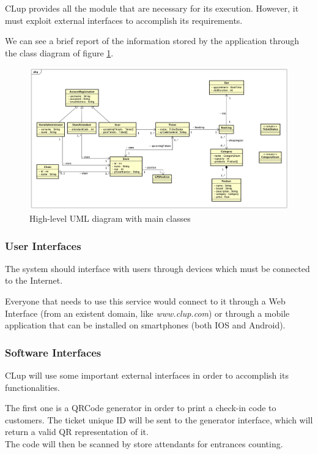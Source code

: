 \documentclass[table, 12pt]{article}
\begin{document}
CLup provides all the module that are necessary for its execution. However, it must exploit external interfaces to accomplish its requirements.

We can see a brief report of the information stored by the application through the class diagram of figure \ref{class_diagram}.

\begin{figure}
    \hspace{-108px}
    \includegraphics[scale=0.46]{assets/UML/HighLevelUML.png}
    \caption{High-level UML diagram with main classes}
    \label{class_diagram}

\end{figure}

\subsubsection{User Interfaces}
The system should interface with users through devices which must be connected to the Internet.

Everyone that needs to use this service would connect to it through a Web Interface (from an existent domain, like \textit{www.clup.com}) or through a mobile application that can be installed on smartphones (both IOS and Android).

\subsubsection{Software Interfaces}
CLup will use some important external interfaces in order to accomplish its functionalities.

The first one is a QRCode generator in order to print a check-in code to customers.
The ticket unique ID will be sent to the generator interface, which will return a valid QR representation of it.\\
The code will then be scanned by store attendants for entrances counting.
\end{document}
